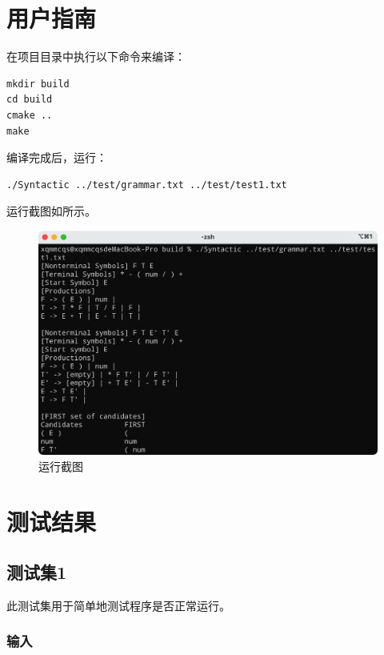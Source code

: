 \documentclass[lang=cn,11pt,a4paper,cite=authornum]{paper}
\begin{document}
\section{用户指南}

在项目目录中执行以下命令来编译：

\begin{code}
\begin{verbatim}
mkdir build
cd build
cmake ..
make
\end{verbatim}
\end{code}

编译完成后，运行：

\begin{code}
\begin{verbatim}
./Syntactic ../test/grammar.txt ../test/test1.txt
\end{verbatim}
\end{code}

运行截图如所示。

\begin{figure}[htbp]

    \centering
    \includegraphics[width=0.7\linewidth]{./Images/running.png}
    \caption{运行截图\label{fig:running}}

\end{figure}

\section{测试结果}

\subsection{测试集1}

此测试集用于简单地测试程序是否正常运行。

\subsubsection{输入}
\end{document}
